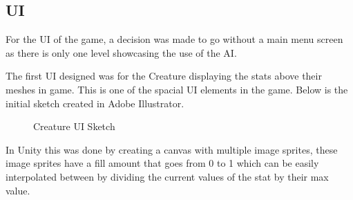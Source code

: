 \documentclass[11pt]{report}
\begin{document}
\subsection{UI}
For the UI of the game, a decision was made to go without a main menu screen as there is only one level showcasing the use of the AI. 

The first UI designed was for the Creature displaying the stats above their meshes in game. This is one of the spacial UI elements in the game. Below is the initial sketch created in Adobe Illustrator.

\begin{figure}[H]
    \centering
    \caption{Creature UI Sketch}
\end{figure}

In Unity this was done by creating a canvas with multiple image sprites, these image sprites have a fill amount that goes from 0 to 1 which can be easily interpolated between by dividing the current values of the stat by their max value.
\end{document}
